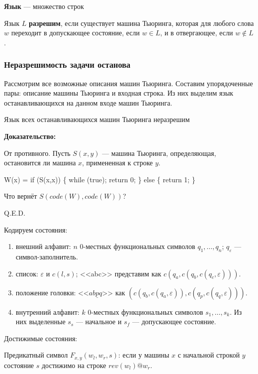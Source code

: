  \textbf{Язык} --- множество строк

 Язык $L$ \textbf{разрешим}, если существует машина Тьюринга, которая для любого слова $w$ переходит в допускающее состояние, если $w \in L$,
и в отвергающее, если $w \notin L$.

\subsubsection{Неразрешимость задачи останова}

 Рассмотрим все возможные описания машин Тьюринга. Составим упорядоченные пары: описание машины Тьюринга и входная строка.
Из них выделим язык останавливающихся на данном входе машин Тьюринга.


Язык всех останавливающихся машин Тьюринга неразрешим

\textbf{Доказательство:}

От противного. Пусть $S(x,y)$ --- машина Тьюринга, определяющая, остановится ли машина $x$, примененная к строке $y$.

\begin{center}W(x) = if (S(x,x)) \{ while (true); return 0; \} else \{ return 1; \}\end{center}

Что вернёт $S(code(W),code(W))$?

\hfill Q.E.D.

Кодируем состояния:

\begin{enumerate}
\item внешний алфавит: $n$ 0-местных функциональных символов $q_1, \dots, q_n$; $q_\varepsilon$ --- символ-заполнитель.
\item список: $\varepsilon$ и $c(l,s)$; <<abc>> представим как $c(q_a,c(q_b,c(q_c,\varepsilon)))$.
\item положение головки: <<$ab\underline{p}q$>> как $(c(q_b,c(q_a,\varepsilon)), c(q_p,c(q_q,\varepsilon)))$.
\item внутренний алфавит: $k$ 0-местных функциональных символов $s_1, \dots, s_k$. Из них выделенные $s_s$ --- начальное и
$s_f$ --- допускающее состояние.
\end{enumerate}

Достижимые состояния:

Предикатный символ $F_{x,y}(w_l,w_r,s)$: если у машины $x$ с начальной строкой $y$ состояние $s$ достижимо на строке $rev(w_l) @ w_r$. 

